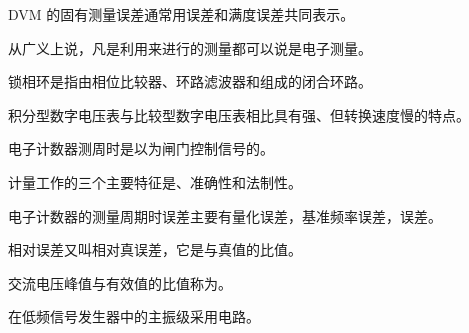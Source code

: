 \documentclass[a4paper,12pt]{examdesign}
\begin{document}
\begin{fillin}[title={一、填空题 (每题 2 分，共 20 分)}]
    \begin{question}
        DVM 的固有测量误差通常用误差和满度误差共同表示。
    \end{question}
    \begin{question}
        从广义上说，凡是利用来进行的测量都可以说是电子测量。
    \end{question}
    \begin{question}
        锁相环是指由相位比较器、环路滤波器和组成的闭合环路。
    \end{question}
    \begin{question}
        积分型数字电压表与比较型数字电压表相比具有强、但转换速度慢的特点。
    \end{question}
    \begin{question}
        电子计数器测周时是以为闸门控制信号的。
    \end{question}
    \begin{question}
        计量工作的三个主要特征是、准确性和法制性。
    \end{question}
    \begin{question}
        电子计数器的测量周期时误差主要有量化误差，基准频率误差，误差。
    \end{question}
    \begin{question}
        相对误差又叫相对真误差，它是与真值的比值。
    \end{question}
    \begin{question}
        交流电压峰值与有效值的比值称为。
    \end{question}
    \begin{question}
        在低频信号发生器中的主振级采用电路。
    \end{question}
\end{fillin}
\end{document}
